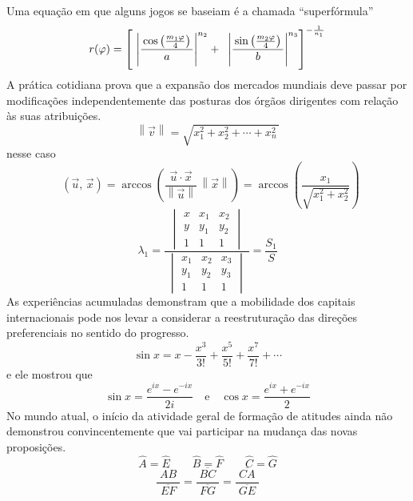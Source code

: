 \documentclass[fleqn]{icat-ufal}
\DeclareMathOperator{\angulo}{\hat{a}ngulo}
\begin{document}
Uma equação em que alguns jogos se baseiam é a chamada ``superfórmula''
\[
    r( \varphi )= 
    \left [\, 
        \vphantom{\begin{array}{c}1\\2\\3\\\end{array}}
        \left| 
            \frac{\,\cos\left( \frac{m_1\varphi }{4} \right)\,}{a} 
        \right|^{n_2} + \;\;
        \left| 
            \frac{\,\sin\left( \frac{m_2\varphi }{4} \right)\,}{b} 
        \right|^{n_3} 
    \right]^{-\frac{1}{n_1}}
\]
A prática cotidiana prova que a expansão dos mercados
mundiais deve passar por modificações independentemente das posturas dos órgãos
dirigentes com relação às suas atribuições. 
\[
    \left\| \vec{v} \right\| = \sqrt{ x_{1}^{2} + x_{2}^{2} + \cdots + x_{n}^{2} \,}
\]
nesse caso
\[
        \angulo(\vec{u},\,\vec{x}) 
        = \arccos\left( \frac{\vec{u}\cdot \vec{x}}{\left\|\vec{u}\right\| } \, \left\|{\vec{x}}\right\| \right) 
        = \arccos\left(\frac{x_1}{\sqrt{x_{1}^{2}+x_{2}^{2}}}\right)
\]
\[
    \lambda_1 = \frac
    {
        \begin{vmatrix}
                x & x_1 & x_2 \\
                y & y_1 & y_2 \\
                1 & 1   & 1
        \end{vmatrix}
    }
    {\;
        \begin{vmatrix}
                x_1 & x_2 & x_3 \\
                y_1 & y_2 & y_3 \\
                1   & 1   & 1
        \end{vmatrix}
      \;
    }
    = \frac{S_1}{S}
\]
As experiências acumuladas
demonstram que a mobilidade dos capitais internacionais pode nos levar a
considerar a reestruturação das direções preferenciais no sentido do progresso. 
\[ 
    \sin x = x - \frac{x^{3}}{3!} + \frac{x^{5}}{5!} + \frac{x^{7}}{7!} + \cdots 
\]  
e ele mostrou que
\[ 
    \sin x = \frac{e^{ix}-e^{-ix}}{2i} \quad \text{e} \quad \cos x = \frac {e^{ix} + e^{-ix}}{2}
\] 
No mundo atual, o início da atividade geral de formação de atitudes ainda não
demonstrou convincentemente que vai participar na mudança das novas proposições.
\[ 
    \hat{A} = \hat{E} \qquad  \hat{B} = \hat{F} \qquad \hat{C} = \hat{G} 
\]  
\[
    \frac{\;\overline{AB}\;}{\;\overline{EF}\;} 
        = \frac{\;\overline{BC}\;}{\;\overline{FG}\;} 
        = \frac{\;\overline{CA}\;}{\;\overline{GE}\;} 
\]
\end{document}

